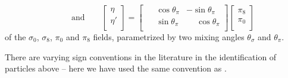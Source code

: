 \begin{itemize}
\begin{equation}
          \qquad \text{and} \qquad
          \begin{bmatrix} \eta \\ \eta' \\ \end{bmatrix} = \begin{bmatrix} \phantom{-} \cos \theta_\pi & -\sin \theta_\pi \\ \phantom{-} \sin \theta_\pi & \phantom{-} \cos \theta_\pi \\ \end{bmatrix} \begin{bmatrix} \pi_8 \\ \pi_0 \\ \end{bmatrix}
      \label{eq:lsm3f:diagonalization_transformation}
      \end{equation}
      of the $\sigma_0$, $\sigma_8$, $\pi_0$ and $\pi_8$ fields, parametrized by two mixing angles $\theta_\sigma$ and $\theta_\pi$.
\end{itemize}

There are varying sign conventions in the literature in the identification of particles above
-- here we have used the same convention as \cite{ref:lsm3f_details}.

